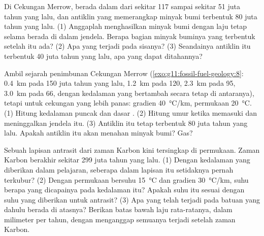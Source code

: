 \begin{exercise}[$\star\star\star$]\label{exo:g11:fossil-fuel-geology:13}
Di Cekungan Merrow,  berada dalam  dari sekitar 117
sampai sekitar 51 juta tahun yang lalu, dan antiklin yang memerangkap minyak
bumi terbentuk 80 juta tahun yang lalu. (1) Anggaplah  menghasilkan
minyak bumi dengan laju tetap selama berada di dalam jendela. Berapa bagian
minyak buminya yang terbentuk setelah  itu ada? (2) Apa yang terjadi
pada sisanya? (3) Seandainya antiklin itu terbentuk 40 juta tahun yang lalu,
apa yang dapat ditahannya?
\end{exercise}

\begin{exercise}[$\star\star\star$]\label{exo:g11:fossil-fuel-geology:14}
Ambil sejarah penimbunan Cekungan Merrow (\cref{exo:g11:fossil-fuel-geology:8}:
\qty{0.4}{km} pada 150 juta tahun yang lalu, \qty{1.2}{km} pada 120, \qty{2.3}{km}
pada 95, \qty{3.0}{km} pada 66, dengan kedalaman yang bertambah secara tetap di
antaranya), tetapi untuk cekungan yang lebih panas: gradien
\qty{40}{\degreeCelsius/km}, permukaan \qty{20}{\degreeCelsius}. (1) Hitung
kedalaman puncak dan dasar . (2) Hitung umur ketika 
memasuki dan meninggalkan jendela itu. (3) Antiklin itu tetap terbentuk 80
juta tahun yang lalu. Apakah antiklin itu akan menahan minyak bumi? Gas?
\end{exercise}

\begin{exercise}[$\star\star\star$]\label{exo:g11:fossil-fuel-geology:15}
Sebuah lapisan antrasit dari zaman Karbon kini tersingkap di permukaan. Zaman
Karbon berakhir sekitar 299 juta tahun yang lalu. (1) Dengan kedalaman yang
diberikan dalam pelajaran, seberapa dalam lapisan itu setidaknya pernah
terkubur? (2) Dengan permukaan bersuhu \qty{15}{\degreeCelsius} dan gradien
\qty{30}{\degreeCelsius/km}, suhu berapa yang dicapainya pada kedalaman itu?
Apakah suhu itu sesuai dengan suhu yang diberikan untuk antrasit? (3) Apa yang
telah terjadi pada batuan yang dahulu berada di atasnya? Berikan batas bawah
laju rata-ratanya, dalam milimeter per tahun, dengan menganggap semuanya terjadi
setelah zaman Karbon.
\end{exercise}

